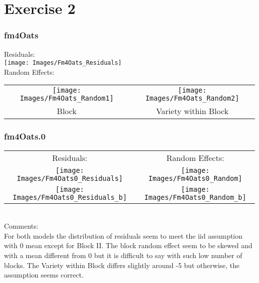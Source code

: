 \documentclass[a4paper,12pt]{article}
\begin{document}
		\newpage
		\section{Exercise 2}
		\subsubsection*{fm4Oats}
		\vfill
		\centering Residuals:\\
		\texttt{[image: Images/Fm4Oats\_Residuals]}\\
		\vfill
		Random Effects:\\
		\begin{tabular}{cc}
			\texttt{[image: Images/Fm4Oats\_Random1]} & \texttt{[image: Images/Fm4Oats\_Random2]} \\
			Block & Variety within Block
		\end{tabular}
	
		\vfill
	
		\justifying
		\subsubsection*{fm4Oats.0}
		\begin{tabular}{cc}
			Residuals: & Random Effects: \\
			\texttt{[image: Images/Fm4Oats0\_Residuals]} & \texttt{[image: Images/Fm4Oats0\_Random]} \\
			\texttt{[image: Images/Fm4Oats0\_Residuals\_b]} & \texttt{[image: Images/Fm4Oats0\_Random\_b]} \\
		\end{tabular}\\
		
		\noindent Comments:\\
		For both models the distribution of residuals seem to meet the iid assumption with 0 mean except for Block II. The block random effect seem to be skewed and with a mean different from 0 but it is difficult to say with such low number of blocks. The Variety within Block differs slightly around -5 but otherwise, the assumption seems correct.
		
		
	
\end{document}
